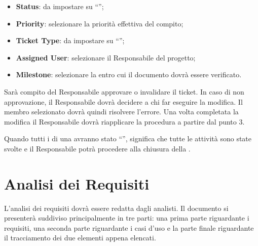 \begin{enumerate}
\begin{itemize}
\item \textbf{Status}: da impostare su ``'';
\item \textbf{Priority}: selezionare la priorità effettiva del compito;
\item \textbf{Ticket Type}: da impostare su ``'';
\item \textbf{Assigned User}: selezionare il Responsabile del progetto;
\item \textbf{Milestone}: selezionare la  entro cui il documento dovrà essere verificato.
\end{itemize}
Sarà  compito del Responsabile approvare o invalidare il ticket. In caso di non approvazione, il Responsabile dovrà decidere a chi far eseguire la modifica. Il membro selezionato dovrà quindi risolvere l'errore. Una volta completata la modifica il Responsabile dovrà riapplicare la procedura a partire dal punto 3.
\end{enumerate}
Quando tutti i  di una  avranno stato ``'', significa che tutte le attività sono state svolte e il Responsabile potrà procedere alla chiusura della .

\newpage
\section{Analisi dei Requisiti}
L'analisi dei requisiti dovrà essere redatta dagli analisti. Il documento si presenterà suddiviso principalmente in tre parti: una prima parte riguardante i requisiti, una seconda parte riguardante i casi d'uso e la parte finale riguardante il tracciamento dei due elementi appena elencati.

